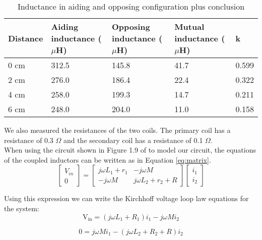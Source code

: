 \documentclass[final]{scrreprt} %
\begin{document}
\begin{table} [h]
\begin{center}
	\begin{tabular}{ l | l | l | l | l }
	Distance & Aiding inductance ($\mu$H) & Opposing inductance ($\mu$H) & Mutual inductance ($\mu$H) & k \\ \hline
  	0 cm & 312.5 & 145.8 & 41.7 & 0.599 \\
	2 cm & 276.0 & 186.4 & 22.4 & 0.322 \\
	4 cm & 258.0 & 199.3 & 14.7 & 0.211 \\
	6 cm & 248.0 & 204.0 & 11.0 & 0.158 \\
	\end{tabular}
	\caption{Inductance in aiding and opposing configuration plus conclusion}
	\label{tab:inductances}
\end{center}
\end{table}

We also measured the resistances of the two coils. 
The primary coil has a resistance of 0.3 $\Omega$ and the secondary coil has a resistance of 0.1 $\Omega$.\\

When using the circuit shown in Figure 1.9 of \cite{epo4-manual} to model our circuit, the equations of the coupled inductors can be written as in Equation \ref{eq:matrix}.\\
\begin{equation}
	\begin{bmatrix}
		V_{in} \\
		0
	\end{bmatrix} =
	\begin{bmatrix}
		j \omega L_1 + r_1 & -j \omega M \\
		-j \omega M & j \omega L_2 + r_2 + R
	\end{bmatrix}
	\begin{bmatrix}
		i_1 \\
		i_2
	\end{bmatrix}
	\label{eq:matrix}
\end{equation}


Using this expression we can write the Kirchhoff voltage loop law equations for the system:
\begin{equation} 
\label{eq3}
\boldsymbol{\mathrm{V_{in}}} = (j\omega {L_{1}} + {R_{1}} ) i_{1} - j\omega M i_{2}
\end{equation}

\begin{equation}
\label{eq4}
0 = j\omega M i_{1} -(j\omega {L_{2}} + {R_{2}} + R) i_{2}
\end{equation}
\end{document}
